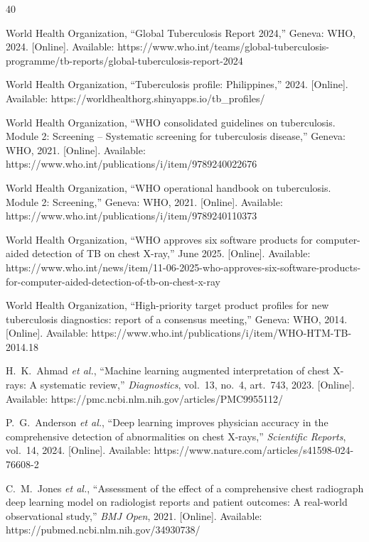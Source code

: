\documentclass[conference, letterpaper]{IEEEtran}
\begin{document}
\begin{thebibliography}{40}

World Health Organization, ``Global Tuberculosis Report 2024,'' Geneva: WHO, 2024. [Online]. Available: https://www.who.int/teams/global-tuberculosis-programme/tb-reports/global-tuberculosis-report-2024

World Health Organization, ``Tuberculosis profile: Philippines,'' 2024. [Online]. Available: https://worldhealthorg.shinyapps.io/tb\_profiles/

World Health Organization, ``WHO consolidated guidelines on tuberculosis. Module 2: Screening -- Systematic screening for tuberculosis disease,'' Geneva: WHO, 2021. [Online]. Available: https://www.who.int/publications/i/item/9789240022676

World Health Organization, ``WHO operational handbook on tuberculosis. Module 2: Screening,'' Geneva: WHO, 2021. [Online]. Available: https://www.who.int/publications/i/item/9789240110373

World Health Organization, ``WHO approves six software products for computer-aided detection of TB on chest X-ray,'' June 2025. [Online]. Available: https://www.who.int/news/item/11-06-2025-who-approves-six-software-products-for-computer-aided-detection-of-tb-on-chest-x-ray

World Health Organization, ``High-priority target product profiles for new tuberculosis diagnostics: report of a consensus meeting,'' Geneva: WHO, 2014. [Online]. Available: https://www.who.int/publications/i/item/WHO-HTM-TB-2014.18

H.~K.~Ahmad \textit{et al.}, ``Machine learning augmented interpretation of chest X-rays: A systematic review,'' \textit{Diagnostics}, vol.~13, no.~4, art.~743, 2023. [Online]. Available: https://pmc.ncbi.nlm.nih.gov/articles/PMC9955112/

P.~G.~Anderson \textit{et al.}, ``Deep learning improves physician accuracy in the comprehensive detection of abnormalities on chest X-rays,'' \textit{Scientific Reports}, vol.~14, 2024. [Online]. Available: https://www.nature.com/articles/s41598-024-76608-2

C.~M.~Jones \textit{et al.}, ``Assessment of the effect of a comprehensive chest radiograph deep learning model on radiologist reports and patient outcomes: A real-world observational study,'' \textit{BMJ Open}, 2021. [Online]. Available: https://pubmed.ncbi.nlm.nih.gov/34930738/


\end{thebibliography}
\end{document}
